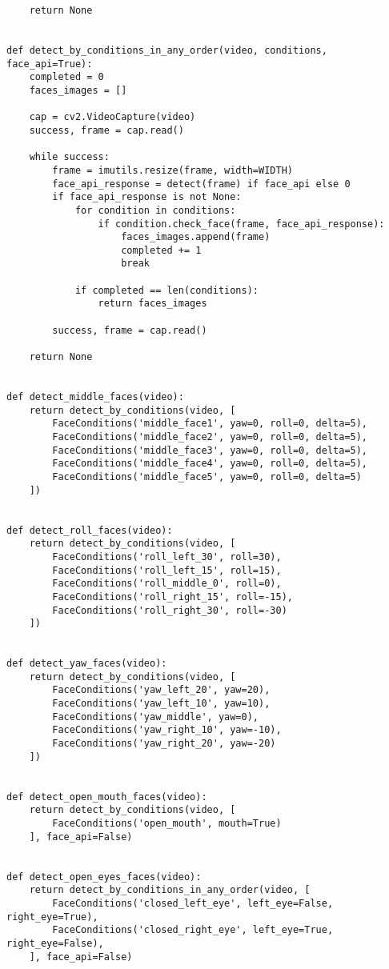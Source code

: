 \begin{verbatim}
    return None


def detect_by_conditions_in_any_order(video, conditions, face_api=True):
    completed = 0
    faces_images = []

    cap = cv2.VideoCapture(video)
    success, frame = cap.read()

    while success:
        frame = imutils.resize(frame, width=WIDTH)
        face_api_response = detect(frame) if face_api else 0
        if face_api_response is not None:
            for condition in conditions:
                if condition.check_face(frame, face_api_response):
                    faces_images.append(frame)
                    completed += 1
                    break

            if completed == len(conditions):
                return faces_images

        success, frame = cap.read()

    return None


def detect_middle_faces(video):
    return detect_by_conditions(video, [
        FaceConditions('middle_face1', yaw=0, roll=0, delta=5),
        FaceConditions('middle_face2', yaw=0, roll=0, delta=5),
        FaceConditions('middle_face3', yaw=0, roll=0, delta=5),
        FaceConditions('middle_face4', yaw=0, roll=0, delta=5),
        FaceConditions('middle_face5', yaw=0, roll=0, delta=5)
    ])


def detect_roll_faces(video):
    return detect_by_conditions(video, [
        FaceConditions('roll_left_30', roll=30),
        FaceConditions('roll_left_15', roll=15),
        FaceConditions('roll_middle_0', roll=0),
        FaceConditions('roll_right_15', roll=-15),
        FaceConditions('roll_right_30', roll=-30)
    ])


def detect_yaw_faces(video):
    return detect_by_conditions(video, [
        FaceConditions('yaw_left_20', yaw=20),
        FaceConditions('yaw_left_10', yaw=10),
        FaceConditions('yaw_middle', yaw=0),
        FaceConditions('yaw_right_10', yaw=-10),
        FaceConditions('yaw_right_20', yaw=-20)
    ])


def detect_open_mouth_faces(video):
    return detect_by_conditions(video, [
        FaceConditions('open_mouth', mouth=True)
    ], face_api=False)


def detect_open_eyes_faces(video):
    return detect_by_conditions_in_any_order(video, [
        FaceConditions('closed_left_eye', left_eye=False, right_eye=True),
        FaceConditions('closed_right_eye', left_eye=True, right_eye=False),
    ], face_api=False)



\end{verbatim}
